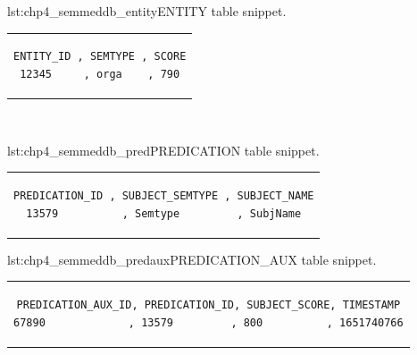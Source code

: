 \begin{minipage}{0.38\linewidth}
\begin{captionedlisting}{lst:chp4_semmeddb_entity}{ENTITY table snippet.}
\centering
\begin{tabular}{c}
\hspace{-1em}
{
\begin{lstlisting}[basicstyle=\ttfamily\small,label={list:example1},columns=flexible]
ENTITY_ID , SEMTYPE , SCORE
12345     , orga    , 790
\end{lstlisting}
}
\end{tabular}
\end{captionedlisting}
\end{minipage}
\,\,\,\,\hfill
\begin{minipage}{0.6\linewidth}
\begin{captionedlisting}{lst:chp4_semmeddb_pred}{PREDICATION table snippet.}
\centering
\begin{tabular}{c}
\hspace{-1em}
{
\begin{lstlisting}[basicstyle=\ttfamily\small,label={list:example1},columns=flexible]
PREDICATION_ID , SUBJECT_SEMTYPE , SUBJECT_NAME
13579          , Semtype         , SubjName
\end{lstlisting}
}
\end{tabular}
\end{captionedlisting}
\end{minipage}

\noindent\hspace{0.23\linewidth}\begin{minipage}{0.8\linewidth}
\begin{captionedlisting}{lst:chp4_semmeddb_predaux}{PREDICATION\_AUX table snippet.}
\centering
\begin{tabular}{c}
\hspace{-7em}
{
\begin{lstlisting}[basicstyle=\ttfamily\small,label={list:example1},columns=flexible]
PREDICATION_AUX_ID, PREDICATION_ID, SUBJECT_SCORE, TIMESTAMP
67890             , 13579         , 800          , 1651740766
\end{lstlisting}
}
\end{tabular}
\end{captionedlisting}
\end{minipage}

